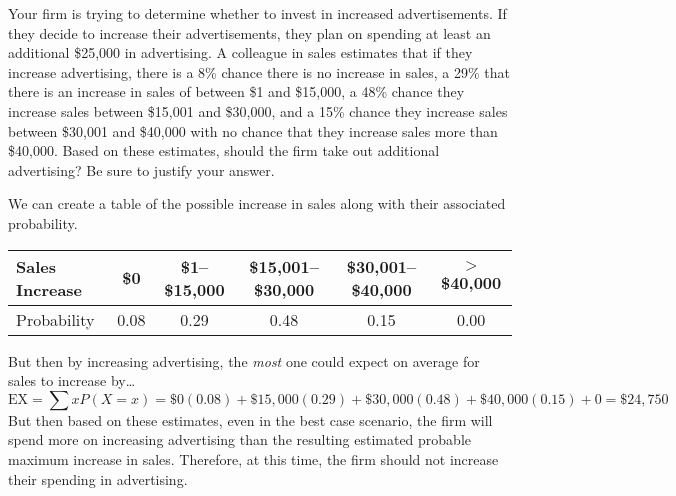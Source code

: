 \documentclass[11pt,letterpaper]{article}
\begin{document}
\newpage



 Your firm is trying to determine whether to invest in increased advertisements. If they decide to increase their advertisements, they plan on spending at least an additional \$25,000 in advertising. A colleague in sales estimates that if they increase advertising, there is a 8\% chance there is no increase in sales, a 29\% that there is an increase in sales of between \$1 and \$15,000, a 48\% chance they increase sales between \$15,001 and \$30,000, and a 15\% chance they increase sales between \$30,001 and \$40,000 with no chance that they increase sales more than \$40,000. Based on these estimates, should the firm take out additional advertising? Be sure to justify your answer. \pspace

\sol We can create a table of the possible increase in sales along with their associated probability. \par
	\begin{table}[h]
	\centering
	\begin{tabular}{l|ccccc}
	Sales Increase & \$0 & \$1--\$15,000 & \$15,001--\$30,000 & \$30,001--\$40,000 & $>$ \$40,000 \\ \hline 
	Probability & 0.08 & 0.29 & 0.48 & 0.15 & 0.00
	\end{tabular}
	\end{table} \par
But then by increasing advertising, the \textit{most} one could expect on average for sales to increase by\dots
	\[
	\text{EX}= \sum x P(X= x)= \$0(0.08) + \$15,\!000 (0.29) + \$30,\!000 (0.48) + \$40,\!000 (0.15) + 0= \$24,\!750
	\]
But then based on these estimates, even in the best case scenario, the firm will spend more on increasing advertising than the resulting estimated probable maximum increase in sales. Therefore, at this time, the firm should not increase their spending in advertising. 
\end{document}
